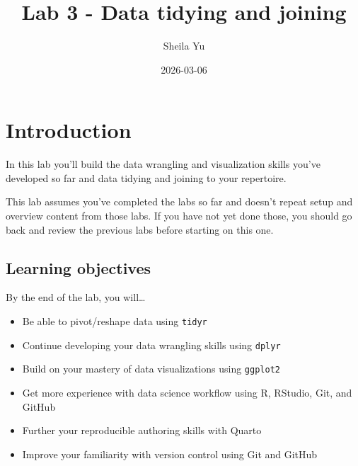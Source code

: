\documentclass[
  letterpaper,
  DIV=11,
  numbers=noendperiod]{scrartcl}
\title{Lab 3 - Data tidying and joining}
\author{Sheila Yu}
\date{2026-03-06}
\providecommand{\tightlist}{%
  \setlength{\itemsep}{0pt}\setlength{\parskip}{0pt}}
\begin{document}
\maketitle


\section{Introduction}\label{introduction}

In this lab you'll build the data wrangling and visualization skills
you've developed so far and data tidying and joining to your repertoire.

\begin{tcolorbox}[enhanced jigsaw, toptitle=1mm, bottomrule=.15mm, colbacktitle=quarto-callout-note-color!10!white, colframe=quarto-callout-note-color-frame, leftrule=.75mm, breakable, toprule=.15mm, colback=white, arc=.35mm, coltitle=black, left=2mm, opacitybacktitle=0.6, bottomtitle=1mm, opacityback=0, title=\textcolor{quarto-callout-note-color}{\faInfo}\hspace{0.5em}{Note}, titlerule=0mm, rightrule=.15mm]

This lab assumes you've completed the labs so far and doesn't repeat
setup and overview content from those labs. If you have not yet done
those, you should go back and review the previous labs before starting
on this one.

\end{tcolorbox}

\subsection{Learning objectives}\label{learning-objectives}

By the end of the lab, you will\ldots{}

\begin{itemize}
\tightlist
\item
  Be able to pivot/reshape data using \texttt{tidyr}
\item
  Continue developing your data wrangling skills using \texttt{dplyr}
\item
  Build on your mastery of data visualizations using \texttt{ggplot2}
\item
  Get more experience with data science workflow using R, RStudio, Git,
  and GitHub
\item
  Further your reproducible authoring skills with Quarto
\item
  Improve your familiarity with version control using Git and GitHub
\end{itemize}
\end{document}
